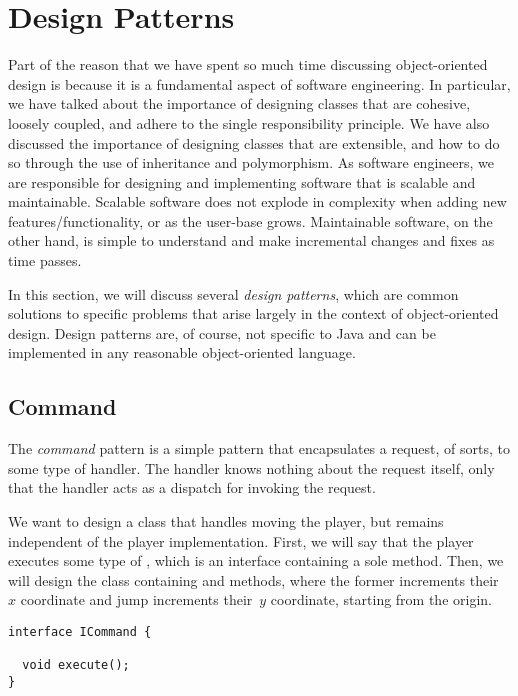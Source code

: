 \section{Design Patterns}

Part of the reason that we have spent so much time discussing object-oriented design is because it is a fundamental aspect of software engineering. 
In particular, we have talked about the importance of designing classes that are cohesive, loosely coupled, and adhere to the single responsibility principle. 
We have also discussed the importance of designing classes that are extensible, and how to do so through the use of inheritance and polymorphism. 
As software engineers, we are responsible for designing and implementing software that is scalable and maintainable. 
Scalable software does not explode in complexity when adding new features/functionality, or as the user-base grows. 
Maintainable software, on the other hand, is simple to understand and make incremental changes and fixes as time passes. 

In this section, we will discuss several \emph{design patterns}, which are common solutions to specific problems that arise largely in the context of object-oriented design. 
Design patterns are, of course, not specific to Java and can be implemented in any reasonable object-oriented language. 

\subsection{Command}

The \emph{command} pattern is a simple pattern that encapsulates a request, of sorts, to some type of handler. 
The handler knows nothing about the request itself, only that the handler acts as a dispatch for invoking the request.

We want to design a class that handles moving the player, but remains independent of the player implementation. 
First, we will say that the player executes some type of , which is an interface containing a sole  method. 
Then, we will design the  class containing  and  methods, where the former increments their~$x$ coordinate and jump increments their~$y$ coordinate, starting from the origin.

\begin{lstlisting}[language=MyJava]
interface ICommand {

  void execute();
}
\end{lstlisting}

